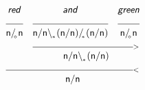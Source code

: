 \documentclass{article}
\newcommand{\deriv}[2]
{  \renewcommand{\arraystretch}{.5}
$\begin{array}[t]{*{#1}{c}}
     #2
   \end{array}$ }
\newcommand{\gf}[1]{\textsf{\textsl{#1}}}
\newcommand{\cf}[1]{\mbox{\ensuremath{\cfont{#1}}}}
\newcommand{\uline}[1]
{\mc{#1}{\hrulefill} }
\newcommand{\mc}[2]
  {\multicolumn{#1}{c}{#2}}
\newcommand{\cfont}{\mathsf}
\newcommand{\bs}{\backslash}
\newcommand{\subsa}[1]{\hspace{-0.75mm}_{_{#1}}}
\newcommand{\subsb}[1]{\hspace{-0.10mm}_{_{#1}}}
\begin{document}
\deriv{3}{
\gf{red} & \gf{and} & \gf{green} \\
\uline{1} & \uline{1} & \uline{1} \\
\cf{n/ \subsa{\diamond} n} & \cf{n/ n\bs \subsb{*} (n/ n)/ \subsa{*} (n/ n)} & \cf{n/ \subsa{\diamond} n} \\
& \mc{2} {\hrulefill_{>}} \\
& \mc{2}{\cf{n/ n\bs \subsb{*} (n/ n)}} \\
 \mc{3} {\hrulefill_{<}} \\
 \mc{3}{\cf{n/ n}} \\
}

\vspace{5mm}
\end{document}
